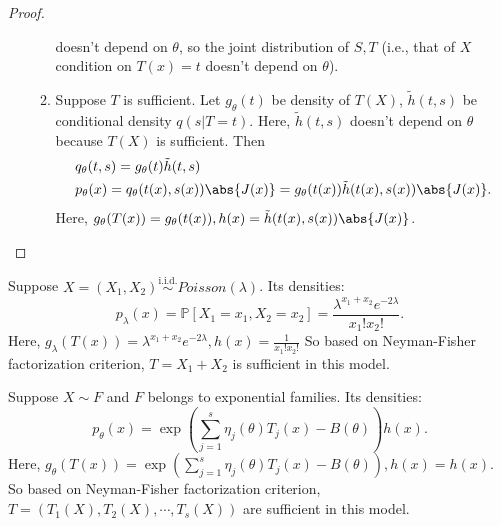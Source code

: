 \documentclass[a4paper]{article}
\begin{document}
\begin{proof}
\begin{itemize}[leftmargin=*]
\begin{enumerate}
\begin{equation}
			\end{equation}
			doesn't depend on $\theta$, so the joint distribution of $S,T$ (i.e., that of $X$ condition on $T(x)=t$ doesn't depend on $\theta$).
			\item Suppose $T$ is sufficient. Let $g_\theta(t)$ be density of $T(X)$, $\tilde{h}(t,s)$ be conditional density $q(s|T=t)$. Here, $\tilde{h}(t,s)$ doesn't depend on $\theta$ because $T(X)$ is sufficient. Then
			\begin{equation}
				\begin{aligned}
					&q_\theta(t,s) = g_\theta(t)\tilde{h}(t,s) \\
					&p_\theta(x) = q_\theta(t(x),s(x))\abs{J(x)} = g_\theta(t(x))\tilde{h}(t(x),s(x))\abs{J(x)}.
				\end{aligned}
			\end{equation}
			Here, $g_\theta(T(x))=g_\theta(t(x)), h(x) = \tilde{h}(t(x),s(x))\abs{J(x)}$.
		\end{enumerate}
	\end{itemize}
\end{proof}

\begin{eg}
	Suppose $X = (X_1, X_2) \stackrel{\text{i.i.d.}}{\sim} Poisson(\lambda)$. Its densities:
	\begin{equation*}
		p_{\lambda}(x) = \mathbb{P}[X_1 = x_1, X_2 = x_2] =  \frac{\lambda^{x_1+x_2} e^{-2\lambda}}{x_1!x_2!}.
	\end{equation*}
	Here, $g_\lambda(T(x)) = \lambda^{x_1+x_2} e^{-2\lambda}, h(x) = \frac{1}{x_1!x_2!}$
	So based on Neyman-Fisher factorization criterion, $T = X_1 + X_2$ is sufficient in this model.
\end{eg}

\begin{eg}
	Suppose $X \sim F$ and $F$ belongs to exponential families. Its densities: 
	\begin{equation*}
		p_\theta (x) = \exp\left(\sum\limits_{j=1}^s\eta_j(\theta)T_j(x) - B(\theta)\right)h(x).
	\end{equation*}
	Here, $g_\theta (T(x)) = \exp\left(\sum\limits_{j=1}^s\eta_j(\theta)T_j(x) - B(\theta)\right), h(x) = h(x)$. So based on Neyman-Fisher factorization criterion, $T = (T_1(X), T_2(X), \cdots,T_s(X))$ are sufficient in this model.
\end{eg}
\end{document}
